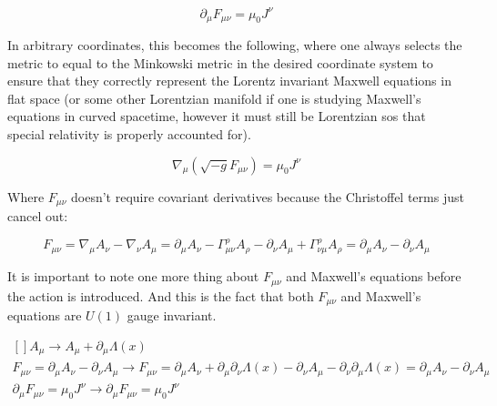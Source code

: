 \documentclass[a4]{article}
\begin{document}
    \begin{framed}
        \begin{equation}
            \partial_{\mu} F_{\mu \nu} = \mu_{0} J^{\nu}
        \end{equation}
    \end{framed}

    In arbitrary coordinates, this becomes the following, where one always selects the metric to equal to the Minkowski metric in the desired coordinate system to ensure that they correctly represent the Lorentz invariant Maxwell equations in flat space (or some other Lorentzian
    manifold if one is studying Maxwell's equations in curved spacetime, however it must still be Lorentzian sos that special relativity is properly accounted for).

    \begin{framed}
        \begin{equation}
            \nabla_{\mu} (\sqrt{-g} F_{\mu \nu}) = \mu_{0} J^{\nu}
        \end{equation}
    \end{framed}

    Where $F_{\mu \nu}$ doesn't require covariant derivatives because the Christoffel terms just cancel out:

    \begin{framed}
        \begin{equation}
            F_{\mu \nu} = \nabla_{\mu} A_{\nu} - \nabla_{\nu} A_{\mu} = \partial_{\mu} A_{\nu} - \Gamma^{\rho}_{\mu \nu} A_{\rho} - \partial_{\nu} A_{\mu} + \Gamma^{\rho}_{\nu \mu} A_{\rho} = \partial_{\mu} A_{\nu} - \partial_{\nu} A_{\mu}
        \end{equation}
    \end{framed}

    It is important to note one more thing about $F_{\mu \nu}$ and Maxwell's equations before the action is introduced. And this is the fact that both $F_{\mu \nu}$ and Maxwell's equations are $U(1)$ gauge invariant.

    \begin{framed}
        \begin{equation}
            \begin{aligned}[]
                A_{\mu} \rightarrow A_{\mu} + \partial_{\mu} \Lambda(x) \\
                F_{\mu \nu} = \partial_{\mu} A_{\nu} - \partial_{\nu} A_{\mu} \rightarrow F_{\mu \nu} = \partial_{\mu} A_{\nu} + \partial_{\mu} \partial_{\nu} \Lambda(x) - \partial_{\nu} A_{\mu} - \partial_{\nu} \partial_{\mu} \Lambda(x) = \partial_{\mu} A_{\nu} - \partial_{\nu} A_{\mu} \\
                \partial_{\mu} F_{\mu \nu} = \mu_{0} J^{\nu} \rightarrow \partial_{\mu} F_{\mu \nu} = \mu_{0} J^{\nu} \\
            \end{aligned}
        \end{equation}
    \end{framed}
\end{document}
